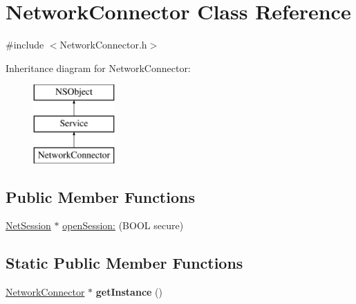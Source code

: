 \hypertarget{interface_network_connector}{
\section{\-Network\-Connector \-Class \-Reference}
\label{interface_network_connector}
}


{\ttfamily \#include $<$\-Network\-Connector.\-h$>$}

\-Inheritance diagram for \-Network\-Connector\-:\begin{figure}[H]
\begin{center}
\leavevmode
\includegraphics[height=3.000000cm]{interface_network_connector}
\end{center}
\end{figure}
\subsection*{\-Public \-Member \-Functions}
\begin{DoxyCompactItemize}
\item 
\hyperlink{interface_net_session}{\-Net\-Session} $\ast$ \hyperlink{interface_network_connector_aeb16d1f0952e1d2b3f32c8b2cbe7dc11}{open\-Session\-:} (\-B\-O\-O\-L secure)
\end{DoxyCompactItemize}
\subsection*{\-Static \-Public \-Member \-Functions}
\begin{DoxyCompactItemize}
\item 
\hypertarget{interface_network_connector_a3795d4ea42cac7c977213143c615bf1f}{
\hyperlink{interface_network_connector}{\-Network\-Connector} $\ast$ {\bfseries get\-Instance} ()}
\label{interface_network_connector_a3795d4ea42cac7c977213143c615bf1f}

\end{DoxyCompactItemize}


